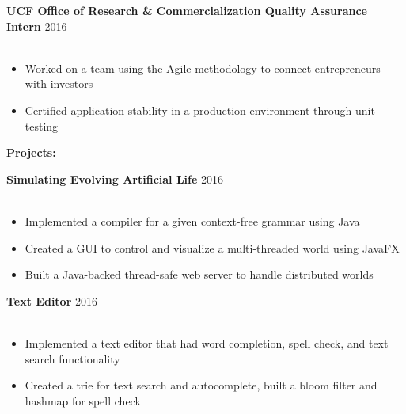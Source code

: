 \documentclass[12pt]{article}
\newcommand{\group}[1]{
	\fontsize{14}{0} \selectfont
	\textbf{#1}
}
\newcommand{\jobCaption}[2]{
	\hspace{0.3em}
	\fontsize{12}{13} \selectfont
	\textbf{#1}
	\fontsize{11}{12} \selectfont 
	\hfill{#2}\\[.1em]
}
\begin{document}
	\vspace{.7em}
\jobCaption{UCF Office of Research \& Commercialization Quality Assurance Intern}{2016}\\[-1.75em]
	\begin{itemize}[leftmargin=1.5cm]
		\setlength\itemsep{-.25em}
		\fontsize{11}{0} \selectfont 
	\item Worked on a team using the Agile methodology to connect entrepreneurs with investors
\item Certified application stability in a production environment through unit testing
	
	\end{itemize}

	\vspace{1em}

\group{Projects:}
	\vspace{.4em}

\jobCaption{Simulating Evolving Artificial Life}{2016}\\[-1.75em]
	\begin{itemize}[leftmargin=1.5cm]
		\setlength\itemsep{-.25em}
		\fontsize{11}{0} \selectfont 
		\item Implemented a compiler for a given context-free grammar using Java 
		\item Created a GUI to control and visualize a multi-threaded world using JavaFX
		\item Built a Java-backed thread-safe web server to handle distributed worlds
		
	\end{itemize}
	\vspace{.7em}
	
	\begin{comment}
	\jobCaption{Pawpulation}{2017}\\[-1.75em]
	\begin{itemize}[leftmargin=1.5cm]
		\setlength\itemsep{-.25em}
		\fontsize{11}{0} \selectfont 
		 
	\item Created a Java application for vets to access an online database of epidemiological data
\item Made the project distributed by creating a server and client for the application
	
	\end{itemize}
	\vspace{.7em}
	\end{comment}
	
	\jobCaption{Text Editor}{2016}\\[-1.75em]
	\begin{itemize}[leftmargin=1.5cm]
		\setlength\itemsep{-.25em}
		\fontsize{11}{0} \selectfont 
		
\item Implemented a text editor that had word completion, spell check, and text search functionality
\item Created a trie for text search and autocomplete, built a bloom filter and hashmap for spell check
	
	\end{itemize}
	\vspace{.7em}
	
\end{document}
